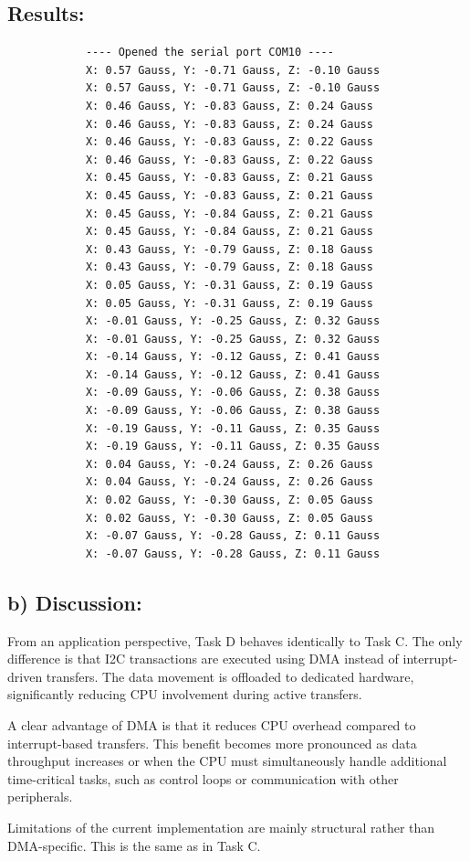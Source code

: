 \subsection*{Results:}
\begin{table}[H]
	\caption{Magnetic field measurements from the LIS3MDL sensor}
	\label{tab:result_gauss_DMA}
	\begin{center}
		\begin{verbatim}
			---- Opened the serial port COM10 ----
			X: 0.57 Gauss, Y: -0.71 Gauss, Z: -0.10 Gauss  
			X: 0.57 Gauss, Y: -0.71 Gauss, Z: -0.10 Gauss  
			X: 0.46 Gauss, Y: -0.83 Gauss, Z: 0.24 Gauss  
			X: 0.46 Gauss, Y: -0.83 Gauss, Z: 0.24 Gauss  
			X: 0.46 Gauss, Y: -0.83 Gauss, Z: 0.22 Gauss  
			X: 0.46 Gauss, Y: -0.83 Gauss, Z: 0.22 Gauss  
			X: 0.45 Gauss, Y: -0.83 Gauss, Z: 0.21 Gauss  
			X: 0.45 Gauss, Y: -0.83 Gauss, Z: 0.21 Gauss  
			X: 0.45 Gauss, Y: -0.84 Gauss, Z: 0.21 Gauss  
			X: 0.45 Gauss, Y: -0.84 Gauss, Z: 0.21 Gauss  
			X: 0.43 Gauss, Y: -0.79 Gauss, Z: 0.18 Gauss  
			X: 0.43 Gauss, Y: -0.79 Gauss, Z: 0.18 Gauss  
			X: 0.05 Gauss, Y: -0.31 Gauss, Z: 0.19 Gauss  
			X: 0.05 Gauss, Y: -0.31 Gauss, Z: 0.19 Gauss  
			X: -0.01 Gauss, Y: -0.25 Gauss, Z: 0.32 Gauss  
			X: -0.01 Gauss, Y: -0.25 Gauss, Z: 0.32 Gauss  
			X: -0.14 Gauss, Y: -0.12 Gauss, Z: 0.41 Gauss  
			X: -0.14 Gauss, Y: -0.12 Gauss, Z: 0.41 Gauss  
			X: -0.09 Gauss, Y: -0.06 Gauss, Z: 0.38 Gauss  
			X: -0.09 Gauss, Y: -0.06 Gauss, Z: 0.38 Gauss  
			X: -0.19 Gauss, Y: -0.11 Gauss, Z: 0.35 Gauss  
			X: -0.19 Gauss, Y: -0.11 Gauss, Z: 0.35 Gauss  
			X: 0.04 Gauss, Y: -0.24 Gauss, Z: 0.26 Gauss  
			X: 0.04 Gauss, Y: -0.24 Gauss, Z: 0.26 Gauss  
			X: 0.02 Gauss, Y: -0.30 Gauss, Z: 0.05 Gauss  
			X: 0.02 Gauss, Y: -0.30 Gauss, Z: 0.05 Gauss  
			X: -0.07 Gauss, Y: -0.28 Gauss, Z: 0.11 Gauss  
			X: -0.07 Gauss, Y: -0.28 Gauss, Z: 0.11 Gauss  
		\end{verbatim}
	\end{center}
\end{table}
\subsection{b) Discussion:}

From an application perspective, Task D behaves identically to Task C. The only difference is that I2C transactions are executed using DMA instead of interrupt-driven transfers. The data movement is offloaded to dedicated hardware, significantly reducing CPU involvement during active transfers.

A clear advantage of DMA is that it reduces CPU overhead compared to interrupt-based transfers. This benefit becomes more pronounced as data throughput increases or when the CPU must simultaneously handle additional time-critical tasks, such as control loops or communication with other peripherals.

Limitations of the current implementation are mainly structural rather than DMA-specific. This is the same as in Task C.

